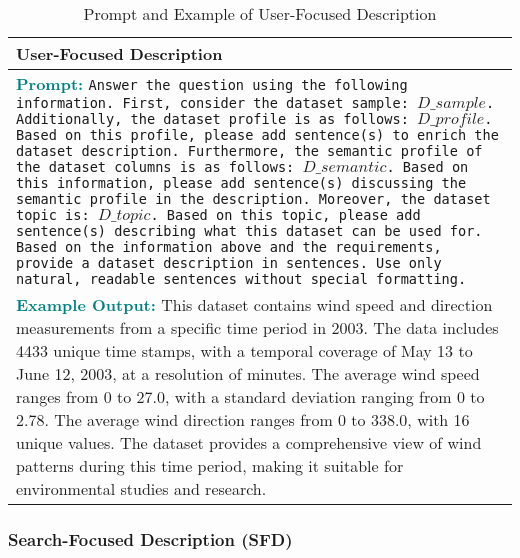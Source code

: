 \begin{table}
    \small
    \centering
    \begin{tabular}{p{8.1cm}}
    \toprule
    \textbf{User-Focused Description} \\
    \midrule
    \textcolor{teal}{\textbf{Prompt:}} 
    \texttt{Answer the question using the following information. First, consider the dataset sample: $D\_sample$. Additionally, the dataset profile is as follows: $D\_profile$. Based on this profile, please add sentence(s) to enrich the dataset description. Furthermore, the semantic profile of the dataset columns is as follows: $D\_semantic$. Based on this information, please add sentence(s) discussing the semantic profile in the description. Moreover, the dataset topic is: $D\_topic$. Based on this topic, please add sentence(s) describing what this dataset can be used for.}
    \texttt{Based on the information above and the requirements, provide a dataset description in sentences. Use only natural, readable sentences without special formatting.}\\
    \midrule
    \textcolor{teal}{\textbf{Example Output:}} 
    This dataset contains wind speed and direction measurements from a specific time period in 2003. The data includes 4433 unique time stamps, with a temporal coverage of May 13 to June 12, 2003, at a resolution of minutes. The average wind speed ranges from 0 to 27.0, with a standard deviation ranging from 0 to 2.78. The average wind direction ranges from 0 to 338.0, with 16 unique values. The dataset provides a comprehensive view of wind patterns during this time period, making it suitable for environmental studies and research.
    \\
    \bottomrule
    \end{tabular}
    \caption{Prompt and Example of User-Focused Description}
    \label{tab:prompt_example_ufd}
    \vspace{-3.0em}
\end{table}


\subsubsection{\textbf{Search-Focused Description (SFD)}}


